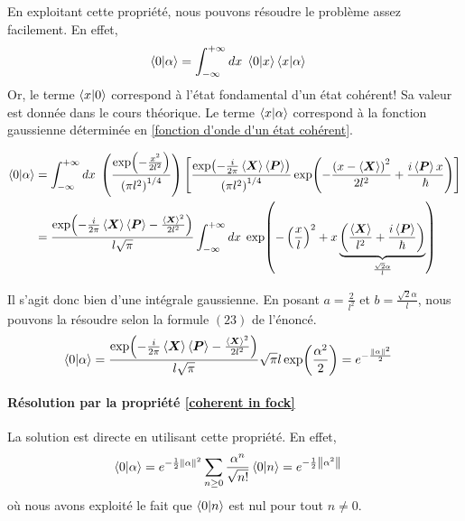\documentclass[11pt,oneside,a4paper]{article}
\newcommand{\h}{\ensuremath{\hbar}}
\begin{document}
En exploitant cette propriété, nous pouvons résoudre le problème assez facilement. En effet,
\begin{align*}
  \braket{0}{\alpha} &= \int_{-\infty}^{+\infty}dx \; \braket{0}{x}\braket{x}{\alpha}
\end{align*}
Or, le terme $\braket{x}{0}$ correspond à l'état fondamental d'un état cohérent! Sa valeur est donnée dans le cours théorique. Le terme $\braket{x}{\alpha}$ correspond à la fonction gaussienne déterminée en \ref{fonction d'onde d'un état cohérent}.

\begin{align*}
  \braket{0}{\alpha} &= \int_{-\infty}^{+\infty}dx \; \left(\frac{\exp(-\frac{x^2}{2l^2})}{\left(\pi l^2\right)^{1/4}}\right)\left[\frac{\exp(-\frac{i}{2\pi}\expval{\bm{X}}\expval{\bm{P}})}{\left(\pi l^2\right)^{1/4}}\exp(-\frac{\left(x-\expval{\bm{X}}\right)^2}{2l^2}+\frac{i\expval{\bm{P}}x}{\hbar})\right]\\
  &= \frac{\exp(-\frac{i}{2\pi}\expval{\bm{X}}\expval{\bm{P}}-\frac{\expval{\bm{X}}^2}{2l^2})}{l\sqrt{\pi}}\int_{-\infty}^{+\infty}dx \; \exp(-\left(\frac{x}{l}\right)^2+x\underbrace{\left(\frac{\expval{\bm{X}}}{l^2}+\frac{i\expval{\bm{P}}}{\h}\right)}_{\frac{\sqrt{2}\alpha}{l}})\\
\end{align*}

Il s'agit donc bien d'une intégrale gaussienne. En posant $a=\frac{2}{l^2}$ et $b=\frac{\sqrt{2}\alpha}{l}$, nous pouvons la résoudre selon la formule $(23)$ de l'énoncé.
\begin{align*}
  \braket{0}{\alpha} &= \frac{\exp(-\frac{i}{2\pi}\expval{\bm{X}}\expval{\bm{P}}-\frac{\expval{\bm{X}}^2}{2l^2})}{l\sqrt{\pi}}\sqrt{\pi}l\exp(\frac{\alpha^2}{2}) = e^{-\frac{\norm{\alpha}^2}{2}}
\end{align*}

\paragraph{Résolution par la propriété \ref{coherent in fock}}

La solution est directe en utilisant cette propriété. En effet,
\begin{align*}
  \braket{0}{\alpha} &= e^{-\frac{1}{2}\norm{\alpha}^2}\sum_{n\geq 0}\frac{\alpha^n}{\sqrt{n!}}\braket{0}{n} = e^{-\frac{1}{2}\norm{\alpha^2}}
\end{align*}
où nous avons exploité le fait que $\braket{0}{n}$ est nul pour tout $n\neq 0$.
\end{document}
